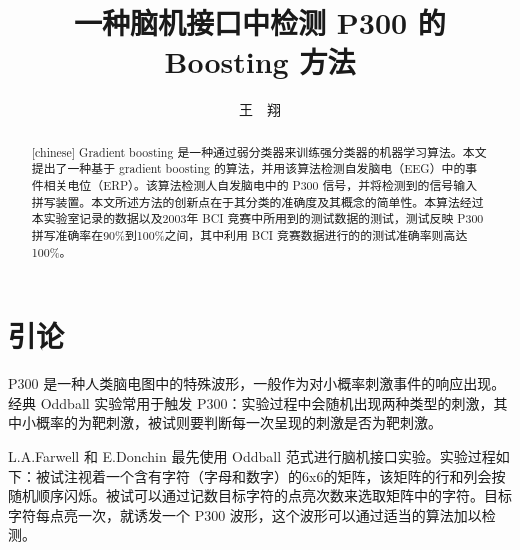 \documentclass[a4paper]{ecust_thesis_translation}
\author{王\ \ 翔}
\title{一种脑机接口中检测 P300 的 Boosting 方法}
\renewcommand\![1]{\immature{#1}}
\begin{document}
\setlength{\parindent}{2em}


\maketitle

\begin{abstract}[chinese]
  Gradient boosting 是一种通过弱分类器来训练强分类器的机器学习算法。本文提出了一种基于 gradient boosting 的算法，并用该算法检测自发脑电（EEG）中的事件相关电位（ERP）。该算法检测人自发脑电中的 P300 信号，并将检测到的信号输入拼写装置。本文所述方法的创新点在于其分类的准确度及其概念的简单性。本算法经过本实验室记录的数据以及2003年 BCI 竞赛中所用到的测试数据的测试，测试反映 P300 拼写准确率在90\%到100\%之间，其中利用 BCI 竞赛数据进行的的测试准确率则高达100\%。
\end{abstract}

\section{引论}

P300 是一种人类脑电图中的特殊波形，一般作为对小概率刺激事件的响应出现。经典 Oddball 实验常用于触发 P300：实验过程中会随机出现两种类型的刺激，其中小概率的为靶刺激，被试则要判断每一次呈现的刺激是否为靶刺激。

L.A.Farwell 和 E.Donchin 最先使用 Oddball 范式进行脑机接口实验。实验过程如下：被试注视着一个含有字符（字母和数字）的6x6的矩阵，该矩阵的行和列会按随机顺序闪烁。被试可以通过记数目标字符的点亮次数来选取矩阵中的字符。目标字符每点亮一次，就诱发一个 P300 波形，这个波形可以通过适当的算法加以检测。
\end{document}
